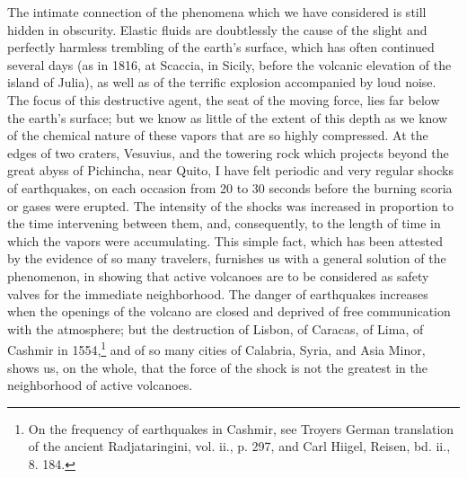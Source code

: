 The intimate connection of the phenomena which we have considered is still hidden in obscurity. Elastic fluids are doubtlessly the cause of the slight and perfectly harmless trembling of the earth's surface, which has often continued several days (as in 1816, at Scaccia, in Sicily, before the volcanic elevation of the island of Julia), as well as of the terrific explosion accompanied by loud noise. The focus of this destructive agent, the seat of the moving force, lies far below the earth's surface; but we know as little of the extent of this depth as we know of the chemical nature of these vapors that are so highly compressed. At the edges of two craters, Vesuvius, and the towering rock which projects beyond the great abyss of Pichincha, near Quito, I have felt periodic and very regular shocks of earthquakes, on each occasion from 20 to 30 seconds before the burning scoria or gases were erupted. The intensity of the shocks was increased in proportion to the time intervening between them, and, consequently, to the length of time in which the vapors were accumulating. This simple fact, which has been attested by the evidence of so many travelers, furnishes us with a general solution of the phenomenon, in showing that active volcanoes are to be considered as safety valves for the immediate neighborhood. The danger of earthquakes increases when the openings of the volcano are closed and deprived of free communication with the atmosphere; but the destruction of Lisbon, of Caracas, of Lima, of Cashmir in 1554,\footnote{On the frequency of earthquakes in Cashmir, see Troyers German translation of the ancient Radjataringini, vol. ii., p. 297, and Carl Hiigel, Reisen, bd. ii., 8. 184.} and of so many cities of Calabria, Syria, and Asia Minor, shows us, on the whole, that the force of the shock is not the greatest in the neighborhood of active volcanoes.

